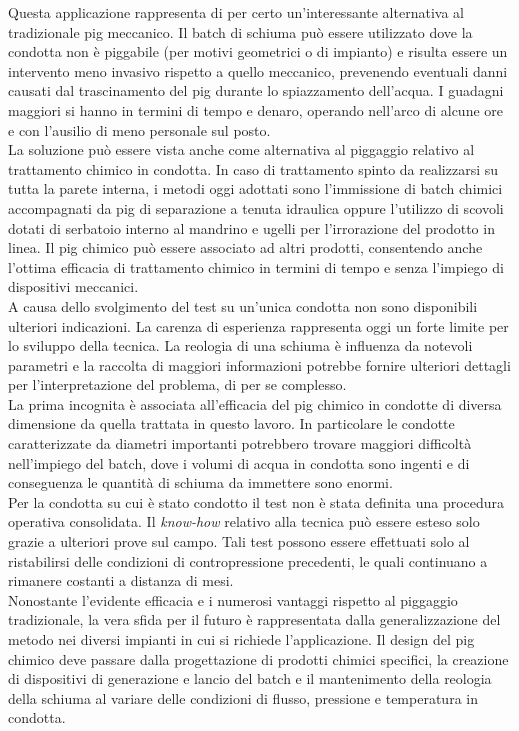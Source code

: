 Questa applicazione rappresenta di per certo un'interessante alternativa al tradizionale pig meccanico. Il batch di schiuma può essere utilizzato dove la condotta non è piggabile (per motivi geometrici o di impianto) e risulta essere un intervento meno invasivo rispetto a quello meccanico, prevenendo eventuali danni causati dal trascinamento del pig durante lo spiazzamento dell'acqua. I guadagni maggiori si hanno in termini di tempo e denaro, operando nell'arco di alcune ore e con l'ausilio di meno personale sul posto.\\
La soluzione può essere vista anche come alternativa al piggaggio relativo al trattamento chimico in condotta. In caso di trattamento spinto da realizzarsi su tutta la parete interna, i metodi oggi adottati sono l'immissione di batch chimici accompagnati da pig di separazione a tenuta idraulica oppure l'utilizzo di scovoli dotati di serbatoio interno al mandrino e ugelli per l'irrorazione del prodotto in linea. Il pig chimico può essere associato ad altri prodotti, consentendo anche l'ottima efficacia di trattamento chimico in termini di tempo e senza l'impiego di dispositivi meccanici.\\
A causa dello svolgimento del test su un'unica condotta non sono disponibili ulteriori indicazioni. La carenza di esperienza rappresenta oggi un forte limite per lo sviluppo della tecnica. La reologia di una schiuma è influenza da notevoli parametri e la raccolta di maggiori informazioni potrebbe fornire ulteriori dettagli per l'interpretazione del problema, di per se complesso.\\
La prima incognita è associata all'efficacia del pig chimico in condotte di diversa dimensione da quella trattata in questo lavoro. In particolare le condotte caratterizzate da diametri importanti potrebbero trovare maggiori difficoltà nell'impiego del batch, dove i volumi di acqua in condotta sono ingenti e di conseguenza le quantità di schiuma da immettere sono enormi.\\
Per la condotta su cui è stato condotto il test non è stata definita una procedura operativa consolidata. Il \textit{know-how} relativo alla tecnica può essere esteso solo grazie a ulteriori prove sul campo. Tali test possono essere effettuati solo al ristabilirsi delle condizioni di contropressione precedenti, le quali continuano a rimanere costanti a distanza di mesi.\\
Nonostante l'evidente efficacia e i numerosi vantaggi rispetto al piggaggio tradizionale, la vera sfida per il futuro è rappresentata dalla generalizzazione del metodo nei diversi impianti in cui si richiede l'applicazione. Il design del pig chimico deve passare dalla progettazione di prodotti chimici specifici, la creazione di dispositivi di generazione e lancio del batch e il mantenimento della reologia della schiuma al variare delle condizioni di flusso, pressione e temperatura in condotta.